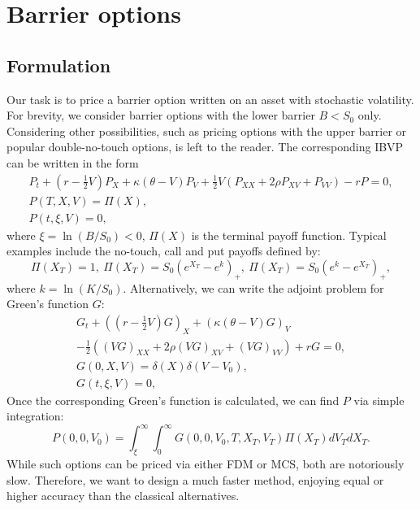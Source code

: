 \documentclass{article}
\begin{document}
\section{Barrier options\label{Sec3}}

\subsection{Formulation\label{Sec31}}

Our task is to price a barrier option written on an asset with stochastic
volatility. For brevity, we consider barrier options with the lower barrier $%
B<S_{0}$ only. Considering other possibilities, such as pricing options with
the upper barrier or popular double-no-touch options, is left to the reader.
The corresponding IBVP can be written in the form%
\begin{equation}
\begin{array}{c}
P_{t}+\left( r-\frac{1}{2}V\right) P_{X}+\kappa \left( \theta -V\right)
P_{V}+\frac{1}{2}V\left( P_{XX}+2\rho P_{XV}+P_{VV}\right) -rP=0, \\ 
P\left( T,X,V\right) =\Pi \left( X\right) , \\ 
P\left( t,\xi ,V\right) =0,%
\end{array}
\label{Eq17}
\end{equation}%
where $\xi =\ln \left( B/S_{0}\right) <0$, $\Pi (X)$ is the terminal payoff
function. Typical examples include the no-touch, call and put payoffs
defined by: 
\begin{equation}
\Pi \left( X_{T}\right) =1,\ \Pi \left( X_{T}\right) =S_{0}\left(
e^{X_{T}}-e^{k}\right) _{+},\ \Pi \left( X_{T}\right) =S_{0}\left(
e^{k}-e^{X_{T}}\right) _{+},  \label{Eq33}
\end{equation}%
where $k=\ln \left( K/S_{0}\right) $. Alternatively, we can write the
adjoint problem for Green's function $G$:%
\begin{equation}
\begin{array}{c}
G_{t}+\left( \left( r-\frac{1}{2}V\right) G\right) _{X}+\left( \kappa \left(
\theta -V\right) G\right) _{V} \\ 
-\frac{1}{2}\left( \left( VG\right) _{XX}+2\rho \left( VG\right)
_{XV}+\left( VG\right) _{VV}\right) +rG=0, \\ 
G\left( 0,X,V\right) =\delta \left( X\right) \delta \left( V-V_{0}\right) ,
\\ 
G\left( t,\xi ,V\right) =0,%
\end{array}
\label{Eq18}
\end{equation}%
Once the corresponding Green's function is calculated, we can find $P$ via
simple integration:%
\begin{equation}
P\left( 0,0,V_{0}\right) =\int_{\xi }^{\infty }\int_{0}^{\infty }G\left(
0,0,V_{0},T,X_{T},V_{T}\right) \Pi \left( X_{T}\right) dV_{T}dX_{T}.
\label{Eq19}
\end{equation}%
While such options can be priced via either FDM or MCS, both are notoriously
slow. Therefore, we want to design a much faster method, enjoying equal or
higher accuracy than the classical alternatives.
\end{document}
